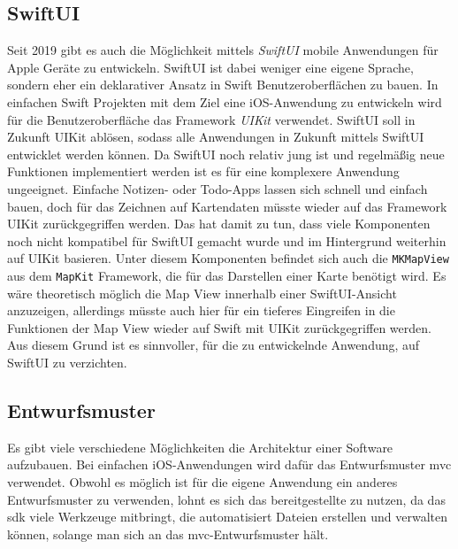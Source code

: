 \subsection{SwiftUI}
Seit 2019 gibt es auch die Möglichkeit mittels \textit{SwiftUI} mobile Anwendungen für Apple Geräte zu entwickeln.
SwiftUI ist dabei weniger eine eigene Sprache, sondern eher ein deklarativer Ansatz in Swift Benutzeroberflächen zu bauen.
In einfachen Swift Projekten mit dem Ziel eine iOS-Anwendung zu entwickeln wird für die Benutzeroberfläche das Framework \textit{UIKit} verwendet.
SwiftUI soll in Zukunft UIKit ablösen, sodass alle Anwendungen in Zukunft mittels SwiftUI entwicklet werden können.\pbreak%
%
Da SwiftUI noch relativ jung ist und regelmäßig neue Funktionen implementiert werden ist es für eine komplexere Anwendung ungeeignet.
Einfache Notizen- oder Todo-Apps lassen sich schnell und einfach bauen, doch für das Zeichnen auf Kartendaten müsste wieder auf das Framework UIKit zurückgegriffen werden.
Das hat damit zu tun, dass viele Komponenten noch nicht kompatibel für SwiftUI gemacht wurde und im Hintergrund weiterhin auf UIKit basieren.
Unter diesem Komponenten befindet sich auch die \texttt{MKMapView} aus dem \texttt{MapKit} Framework, die für das Darstellen einer Karte benötigt wird.
Es wäre theoretisch möglich die Map View innerhalb einer SwiftUI-Ansicht anzuzeigen, allerdings müsste auch hier für ein tieferes Eingreifen in die Funktionen der Map View wieder auf Swift mit UIKit zurückgegriffen werden.
Aus diesem Grund ist es sinnvoller, für die zu entwickelnde Anwendung, auf SwiftUI zu verzichten.

\subsection{Entwurfsmuster}
Es gibt viele verschiedene Möglichkeiten die Architektur einer Software aufzubauen.
Bei einfachen iOS-Anwendungen wird dafür das Entwurfsmuster \ac{mvc} verwendet.
Obwohl es möglich ist für die eigene Anwendung ein anderes Entwurfsmuster zu verwenden, lohnt es sich das bereitgestellte zu nutzen, da das \Gls{sdk} viele Werkzeuge mitbringt, die automatisiert Dateien erstellen und verwalten können, solange man sich an das \ac{mvc}-Entwurfsmuster hält.
